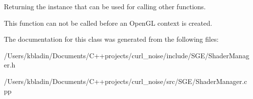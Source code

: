 Returning the instance that can be used for calling other functions. 

This function can not be called before an Open\-G\-L context is created. 

The documentation for this class was generated from the following files\-:\begin{DoxyCompactItemize}
\item 
/\-Users/kbladin/\-Documents/\-C++projects/curl\-\_\-noise/include/\-S\-G\-E/Shader\-Manager.\-h\item 
/\-Users/kbladin/\-Documents/\-C++projects/curl\-\_\-noise/src/\-S\-G\-E/Shader\-Manager.\-cpp\end{DoxyCompactItemize}
